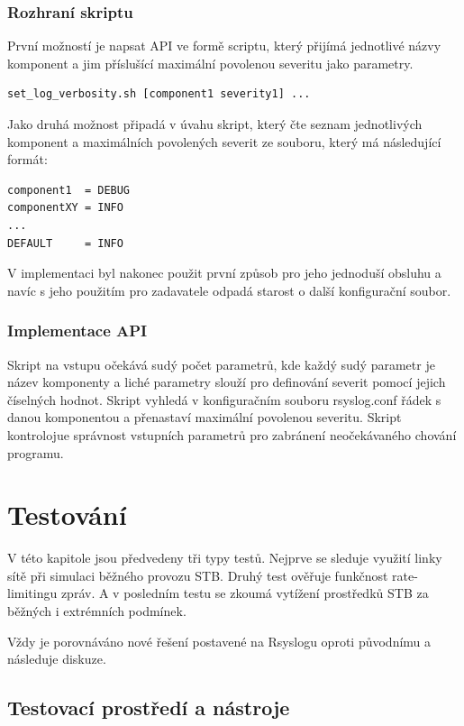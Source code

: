 \documentclass[thesis=B,czech]{FITthesis}[2012/06/26]
\begin{document}
\subsection{Rozhraní skriptu}
První možností je napsat API ve formě scriptu, který přijímá jednotlivé názvy komponent a jim příslušící maximální povolenou severitu jako parametry.

\begin{lstlisting}[style=RainerScriptSimpleStyle]
set_log_verbosity.sh [component1 severity1] ...
\end{lstlisting}

Jako druhá možnost připadá v úvahu skript, který čte seznam jednotlivých komponent a maximálních povolených severit ze souboru, který má následující formát:

\begin{lstlisting}[style=RainerScriptSimpleStyle]
component1  = DEBUG
componentXY = INFO
...
DEFAULT     = INFO
\end{lstlisting}

V implementaci byl nakonec použit první způsob pro jeho jednoduší obsluhu a navíc s jeho použitím pro zadavatele odpadá starost o další konfigurační soubor.

\subsection{Implementace API}
Skript na vstupu očekává sudý počet parametrů, kde každý sudý parametr je název komponenty a liché parametry slouží pro definování severit pomocí jejich číselných hodnot.
Skript vyhledá v konfiguračním souboru rsyslog.conf řádek s danou komponentou a přenastaví maximální povolenou severitu. Skript kontrolojue správnost vstupních parametrů pro zabránení neočekávaného chování programu.


\chapter{Testování}
V této kapitole jsou předvedeny tři typy testů.
Nejprve se sleduje využití linky sítě při simulaci běžného provozu STB. Druhý test ověřuje funkčnost rate-limitingu zpráv. A v posledním testu se zkoumá vytížení prostředků STB za běžných i extrémních podmínek.

Vždy je porovnáváno nové řešení postavené na Rsyslogu oproti původnímu a následuje diskuze.

\section{Testovací prostředí a nástroje}
\end{document}
